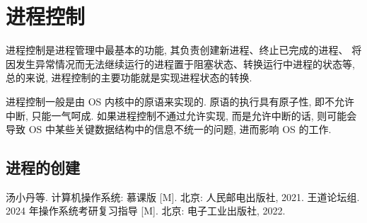 \documentclass[10pt,UTF8]{book} %
\begin{document}
\section{进程控制}

进程控制是进程管理中最基本的功能, 其负责创建新进程、终止已完成的进程、
将因发生异常情况而无法继续运行的进程置于阻塞状态、转换运行中进程的状态等,
总的来说, 进程控制的主要功能就是实现进程状态的转换.

进程控制一般是由 OS 内核中的原语来实现的. 原语的执行具有原子性,
即不允许中断, 只能一气呵成. 如果进程控制不通过允许实现, 而是允许中断的话,
则可能会导致 OS 中某些关键数据结构中的信息不统一的问题, 进而影响 OS 的工作.

\subsection{进程的创建}



\onecolumn
\begin{thebibliography}{1}
    汤小丹等. 计算机操作系统: 慕课版 [M]. 北京: 人民邮电出版社, 2021.
    王道论坛组. 2024 年操作系统考研复习指导 [M]. 北京: 电子工业出版社, 2022.
\end{thebibliography}


\end{document}
